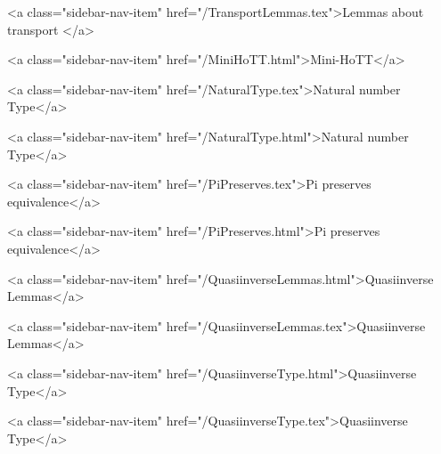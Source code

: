       
    
      
        
          <a class="sidebar-nav-item" href="/TransportLemmas.tex">Lemmas about transport </a>
        
      
    
      
        
          <a class="sidebar-nav-item" href="/MiniHoTT.html">Mini-HoTT</a>
        
      
    
      
        
      
    
      
        
          <a class="sidebar-nav-item" href="/NaturalType.tex">Natural number Type</a>
        
      
    
      
        
          <a class="sidebar-nav-item" href="/NaturalType.html">Natural number Type</a>
        
      
    
      
        
          <a class="sidebar-nav-item" href="/PiPreserves.tex">Pi preserves equivalence</a>
        
      
    
      
        
          <a class="sidebar-nav-item" href="/PiPreserves.html">Pi preserves equivalence</a>
        
      
    
      
        
          <a class="sidebar-nav-item" href="/QuasiinverseLemmas.html">Quasiinverse Lemmas</a>
        
      
    
      
        
          <a class="sidebar-nav-item" href="/QuasiinverseLemmas.tex">Quasiinverse Lemmas</a>
        
      
    
      
        
          <a class="sidebar-nav-item" href="/QuasiinverseType.html">Quasiinverse Type</a>
        
      
    
      
        
          <a class="sidebar-nav-item" href="/QuasiinverseType.tex">Quasiinverse Type</a>
        
      
    
